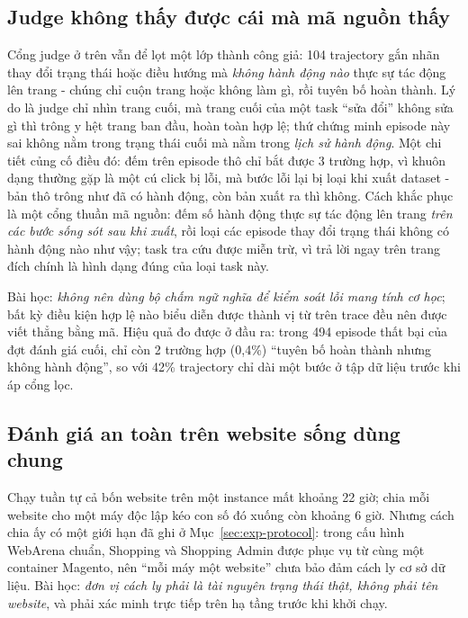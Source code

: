 \subsection{Judge không thấy được cái mà mã nguồn thấy}

Cổng judge ở trên vẫn để lọt một lớp thành công giả: 104 trajectory gắn nhãn
thay đổi trạng thái hoặc điều hướng mà \emph{không hành động nào} thực sự tác
động lên trang - chúng chỉ cuộn trang hoặc không làm gì, rồi tuyên bố hoàn
thành. Lý do là judge chỉ nhìn trang cuối, mà trang cuối của một task ``sửa
đổi'' không sửa gì thì trông y hệt trang ban đầu, hoàn toàn hợp lệ; thứ chứng
minh episode này sai không nằm trong trạng thái cuối mà nằm trong \emph{lịch sử
hành động}. Một chi tiết củng cố điều đó: đếm trên episode thô chỉ bắt được 3
trường hợp, vì khuôn dạng thường gặp là một cú click bị lỗi, mà bước lỗi lại bị
loại khi xuất dataset - bản thô trông như đã có hành động, còn bản xuất ra thì
không. Cách khắc phục là một cổng thuần mã nguồn: đếm số hành động thực sự tác
động lên trang \emph{trên các bước sống sót sau khi xuất}, rồi loại các episode
thay đổi trạng thái không có hành động nào như vậy; task tra cứu được miễn trừ,
vì trả lời ngay trên trang đích chính là hình dạng đúng của loại task này.

Bài học: \emph{không nên dùng bộ chấm ngữ nghĩa để kiểm soát lỗi mang tính cơ
học}; bất kỳ điều kiện hợp lệ nào biểu diễn được thành vị từ trên trace đều nên
được viết thẳng bằng mã. Hiệu quả đo được ở đầu ra: trong 494 episode thất bại
của đợt đánh giá cuối, chỉ còn 2 trường hợp (0{,}4\%) ``tuyên bố hoàn thành
nhưng không hành động'', so với 42\% trajectory chỉ dài một bước ở tập dữ liệu
trước khi áp cổng lọc.

\subsection{Đánh giá an toàn trên website sống dùng chung}

Chạy tuần tự cả bốn website trên một instance mất khoảng 22 giờ; chia mỗi
website cho một máy độc lập kéo con số đó xuống còn khoảng 6 giờ. Nhưng cách
chia ấy có một giới hạn đã ghi ở Mục~\ref{sec:exp-protocol}: trong cấu hình
WebArena chuẩn, Shopping và Shopping Admin được phục vụ từ cùng một container
Magento, nên ``mỗi máy một website'' chưa bảo đảm cách ly cơ sở dữ liệu. Bài
học: \emph{đơn vị cách ly phải là tài nguyên trạng thái thật, không phải tên
website}, và phải xác minh trực tiếp trên hạ tầng trước khi khởi chạy.

